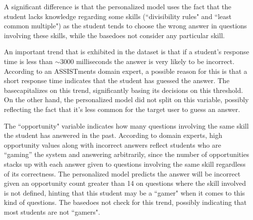 \documentclass[letterpaper]{article} %
\theoremstyle{definition}
\begin{document}

A significant difference is that the personalized model uses the fact that the student lacks knowledge regarding some skills (``divisibility rules" and ``least common multiple") as the student tends to choose the wrong answer in questions involving these skills, while the basedoes not consider any particular skill.

An important  trend that is  exhibited in  the dataset is that if a student's response time is less than $\sim$3000 milliseconds the answer is very likely to be incorrect.
According to an ASSISTments domain expert, a possible reason for this is that a short response time indicates that the student has guessed the answer.
The basecapitalizes on this trend, significantly basing its decisions on this threshold.
On the other hand, the personalized model did not split on this variable, possibly reflecting the fact that it's less common for the target user to guess an answer.

The ``opportunity" variable indicates how many questions involving the same skill the student has answered in the past.
According to domain experts, high opportunity values along with incorrect answers reflect students who are ``gaming'' the system and answering arbitrarily, since the number of opportunities stacks up with each answer given to questions involving the same skill regardless of its correctness.
The personalized model predicts the answer will be incorrect given an opportunity count greater than 14 on questions where the skill involved is not defined, hinting that this student may be a ``gamer" when it comes to this kind of questions. The basedoes not check for this trend, possibly indicating that most students are not ``gamers".

\end{document}
